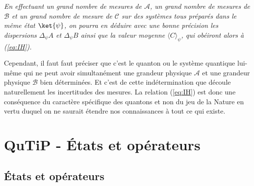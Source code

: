 \medskip\colorbox[gray]{0.8}{
\parbox[c]{0.9\textwidth}{
\emph{En effectuant un grand nombre de mesures de $\mathcal{A}$, un grand nombre
de mesures de $\mathcal{B}$ et un grand nombre de mesure de $\mathcal{C}$ sur
des systèmes tous préparés dans le même état $\ket{\psi}$, on pourra en déduire
avec une bonne précision les dispersions $\Delta_{\psi}A$ et $\Delta_{\psi}B$
ainsi que la valeur moyenne $\langle C\rangle_{\psi}$, qui obéiront alors à
(\ref{eq:IH}).}
}}
\medskip

Cependant, il faut faut préciser que c'est le quanton ou le système quantique
lui-même qui ne peut avoir simultanément une grandeur physique $\mathcal{A}$
et une grandeur physique $\mathcal{B}$ bien déterminées. Et c'est de cette
indétermination que découle naturellement les incertitudes des mesures. La
relation (\ref{eq:IH}) est donc une conséquence du caractère spécifique des
quantons et non du jeu de la Nature en vertu duquel on ne saurait étendre nos
connaissances à tout ce qui existe.

\section{QuTiP - États et opérateurs}

\subsection{États et opérateurs}

